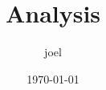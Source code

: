 \documentclass{article}[12pt]
\title{Analysis}
\author{joel}
\date{\today}
\theoremstyle{definition}
\theoremstyle{remark}
\begin{document}
\maketitle

\section{}
\end{document}
